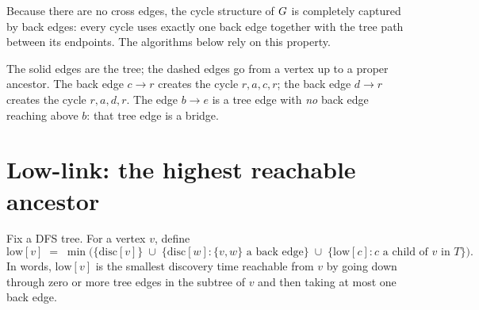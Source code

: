 Because there are no cross edges, the cycle structure of $G$ is completely captured
by back edges: every cycle uses exactly one back edge together with the tree path
between its endpoints. The algorithms below rely on this property.

\begin{center}
\end{center}

The solid edges are the tree; the dashed edges go from a vertex up to a proper
ancestor. The back edge $c\!\to\!r$ creates the cycle $r,a,c,r$; the back edge
$d\!\to\!r$ creates the cycle $r,a,d,r$. The edge $b\!\to\!e$ is a tree edge with
\emph{no} back edge reaching above $b$: that tree edge is a bridge.

\section{Low-link: the highest reachable ancestor}
\label{ch10:lowlink}

\begin{definition}
\label{ch10:def-low}
Fix a DFS tree. For a vertex $v$, define
\[
  \mathrm{low}[v] \;=\; \min\Big(
    \{\mathrm{disc}[v]\}
    \;\cup\;
    \{\mathrm{disc}[w] : \{v,w\}\text{ a back edge}\}
    \;\cup\;
    \{\mathrm{low}[c] : c\text{ a child of }v\text{ in }T\}
  \Big).
\]
In words, $\mathrm{low}[v]$ is the smallest discovery time reachable from $v$ by going
down through zero or more tree edges in the subtree of $v$ and then taking at most one
back edge.
\end{definition}

